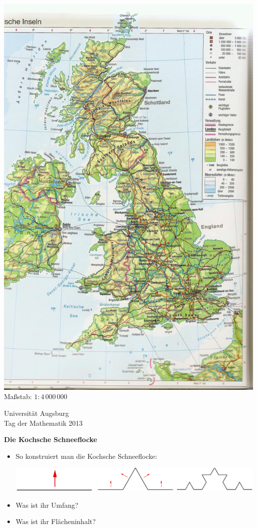\documentclass[a4paper,ngerman]{scrartcl}
\newcommand{\drawHere}{%
  \begin{center}%
    \fbox{\parbox[c][0.9\textwidth]{0.9\textwidth}{\ }}%
  \end{center}}
\newcommand{\header}{%
  \begin{raggedleft}
  \tiny Universität Augsburg \\
  Tag der Mathematik 2013 \par
  \end{raggedleft}}
\begin{document}
\begin{center}%
  \includegraphics[scale=2.8]{england-fein-fein} \\
  Maßstab: $1 : 4\,000\,000$
\end{center}
\newpage

\header

\begin{center}
  \Huge\bf
  Die Kochsche Schneeflocke
\end{center}

\vfill
\drawHere

\vfill
\Large

\renewcommand{\labelitemi}{$\bigstar$}

\begin{itemize}
  \item So konstruiert man die Kochsche Schneeflocke:

  \begin{center}
    \includegraphics[scale=0.5]{koch}
  \end{center}
  \item Was ist ihr Umfang?
  \item Was ist ihr Flächeninhalt?
\end{itemize}
\end{document}
